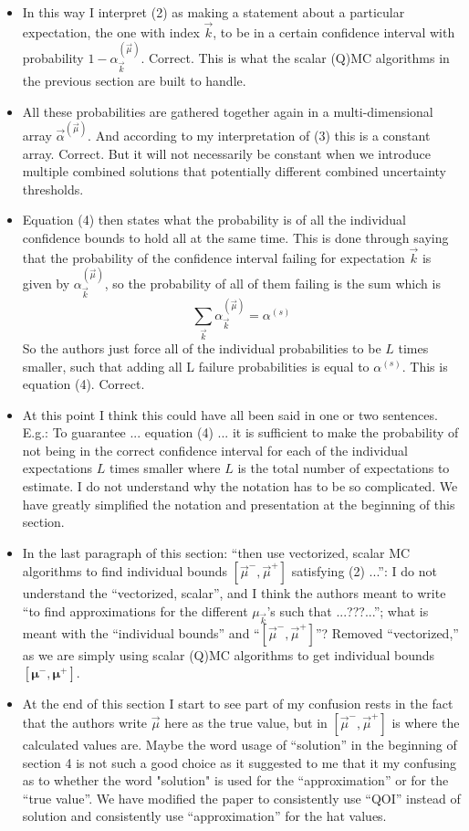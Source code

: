 \documentclass{article}[12pt]
\newcommand{\Referee}[1]{{\color{blue} #1 \newline}}
\begin{document}
\begin{itemize}
    \item \Referee{In this way I interpret (2) as making a statement about a particular expectation, the one with index $\vec{k}$, to be in a certain confidence interval with probability $1 - \alpha_{\vec{k}}^{(\vec{\mu})}$.}Correct. This is what the scalar (Q)MC algorithms in the previous section are built to handle. 
    \item \Referee{All these probabilities are gathered together again in a multi-dimensional array $\vec{\alpha}^{(\vec{\mu})}$. And according to my interpretation of (3) this is a constant array.}Correct. But it will not necessarily be constant when we introduce multiple combined solutions that potentially different combined uncertainty thresholds.
    \item \Referee{Equation (4) then states what the probability is of all the individual confidence bounds to hold all at the same time. This is done through saying that the probability of the confidence interval failing for expectation $\vec{k}$ is given by $\alpha_{\vec{k}}^{(\vec{\mu})}$, so the probability of all of them failing is the sum which is
    $$\sum_{\vec{k}} \alpha_{\vec{k}}^{(\vec{\mu})} = \alpha^{(s)}$$
    So the authors just force all of the individual probabilities to be $L$ times smaller, such that adding all L failure probabilities is equal to $\alpha^{(s)}$. This is equation (4).}Correct. 
    \item \Referee{At this point I think this could have all been said in one or two sentences. E.g.: To guarantee ... equation (4) ... it is sufficient to make the probability of not being in the correct confidence interval for each of the individual expectations $L$ times smaller where $L$ is the total number of expectations to estimate. I do not understand why the notation has to be so complicated.}We have greatly simplified the notation and presentation at the beginning of this section. 
    \item \Referee{In the last paragraph of this section: ``then use vectorized, scalar MC algorithms to find individual bounds $[\vec{\mu}^-, \vec{\mu}^+]$ satisfying (2) ...'': I do not understand the ``vectorized, scalar'', and I think the authors meant to write ``to find approximations for the different $\mu_{\vec{k}}$'s such that ...???...''; what is meant with the ``individual bounds'' and ``$[\vec{\mu}^-, \vec{\mu}^+]$''?}Removed ``vectorized,'' as we are simply using scalar (Q)MC algorithms to get individual bounds $[\boldsymbol{\mu}^-,\boldsymbol{\mu}^+]$. 
    \item \Referee{At the end of this section I start to see part of my confusion rests in the fact that the authors write $\vec{\mu}$ here as the true value, but in $[\vec{\mu}^-, \vec{\mu}^+]$ is where the calculated values are. Maybe the word usage of ``solution'' in the beginning of section 4 is not such a good choice as it suggested to me that it my confusing as to whether the word "solution" is used for the ``approximation'' or for the ``true value''.}We have modified the paper to consistently use ``QOI'' instead of solution and consistently use ``approximation'' for the hat values. 

\end{itemize}
\end{document}
